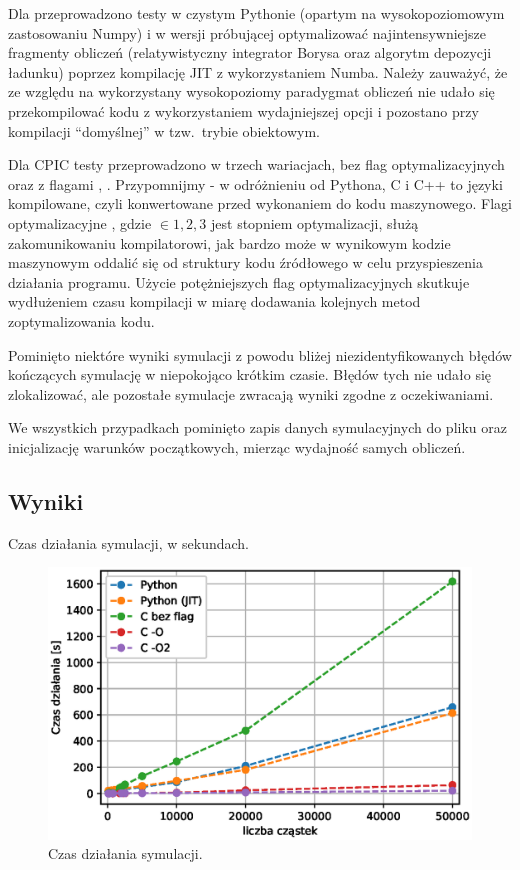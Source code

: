 Dla \pythonpic{} przeprowadzono testy w czystym Pythonie (opartym na wysokopoziomowym zastosowaniu Numpy)
i w wersji próbującej optymalizować najintensywniejsze fragmenty obliczeń (relatywistyczny integrator Borysa
oraz algorytm depozycji ładunku) poprzez kompilację JIT z wykorzystaniem Numba. Należy zauważyć, że ze względu
na wykorzystany wysokopoziomy paradygmat obliczeń nie udało się przekompilować kodu z wykorzystaniem
wydajniejszej opcji  i pozostano przy kompilacji ``domyślnej'' w tzw.\ trybie obiektowym.

Dla CPIC testy przeprowadzono w trzech wariacjach, bez flag optymalizacyjnych oraz z flagami , .  
Przypomnijmy - w odróżnieniu od Pythona, C i C++ to języki kompilowane, czyli
    konwertowane przed wykonaniem do kodu maszynowego. Flagi optymalizacyjne , gdzie  $\in {1, 2, 3}$ jest stopniem optymalizacji, służą zakomunikowaniu kompilatorowi, jak bardzo może w
    wynikowym kodzie maszynowym oddalić się od struktury kodu źródłowego w celu przyspieszenia działania programu. Użycie potężniejszych flag optymalizacyjnych skutkuje wydłużeniem czasu kompilacji w miarę
    dodawania kolejnych metod zoptymalizowania kodu.

Pominięto niektóre wyniki symulacji z powodu bliżej niezidentyfikowanych błędów kończących symulację w niepokojąco
krótkim czasie. Błędów tych nie udało się zlokalizować, ale pozostałe symulacje zwracają wyniki zgodne z oczekiwaniami.

We wszystkich przypadkach pominięto zapis danych symulacyjnych do pliku oraz
inicjalizację warunków początkowych, mierząc wydajność samych obliczeń.

\subsection{Wyniki}

\begin{table}[H]
\centering
\footnotesize
\label{table:runtime}

\caption{Czas działania symulacji, w sekundach.}
\end{table}

\begin{figure}[h!]
  \includegraphics[width=\textwidth]{Images/runtimes}
  \caption{Czas działania symulacji.}\label{fig:runtime}
\end{figure}

